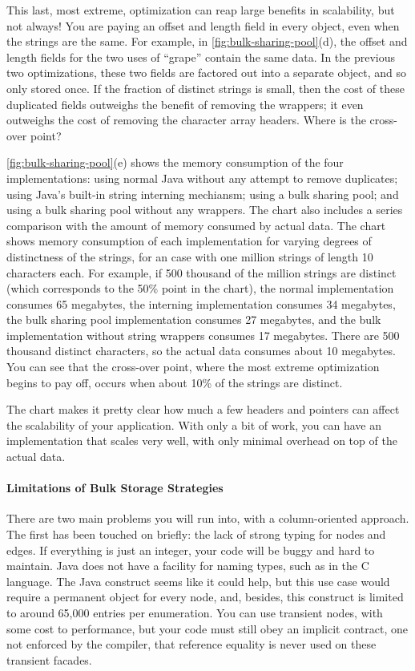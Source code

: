 This last, most extreme, optimization can reap large benefits in scalability,
but not always! You are paying an offset and length field in every object, even
when the strings are the same. For example, in
\autoref{fig:bulk-sharing-pool}(d), the offset and length fields for the two
uses of ``grape'' contain the same data. In the previous two optimizations,
these two fields are factored out into a separate  object, and so
only stored once. If the fraction of distinct strings
is small, then the cost of these duplicated fields outweighs the benefit of
removing the wrappers; it even outweighs the cost of removing the character
array headers. Where is the cross-over point?

\autoref{fig:bulk-sharing-pool}(e) shows the memory consumption of the four
implementations: using normal Java  without any attempt to remove
duplicates; using Java's built-in string interning mechiansm; using a bulk
sharing pool; and using a bulk sharing pool without any  wrappers.
The chart also includes a series comparison with the amount of memory consumed by
actual data.  The chart shows memory consumption of each implementation for
varying degrees of distinctness of the strings, for an case with one million
strings of length 10 characters each.
For example, if 500 thousand of the million strings are distinct (which
corresponds to the 50\% point in the chart), the normal implementation consumes
65 megabytes, the interning implementation consumes 34 megabytes, the bulk
sharing pool implementation consumes 27 megabytes, and the bulk implementation
without string wrappers consumes 17 megabytes. There are 500 thousand
distinct characters, so the actual data consumes about 10 megabytes. You can see
that the cross-over point, where the most extreme optimization begins to pay
off, occurs when about 10\% of the strings are distinct.

The chart makes it pretty clear how much a few headers and pointers can affect
the scalability of your application. With only a bit of work, you can have an
implementation that scales very well, with only minimal overhead on top of the
actual data.

\paragraph{Limitations of Bulk Storage Strategies}

There are two main problems you will run into, with a column-oriented approach.
The first has been touched on briefly: the lack of strong typing for nodes and
edges. If everything is just an integer, your code will be buggy and hard to
maintain. Java does not have a facility for naming types, such as 
in the C language. The Java  construct seems like it could help, but
this use case would require a permanent object for every node, and, besides,
this construct is limited to around 65,000 entries per enumeration. You can use transient
nodes, with some cost to performance, but your code must still obey an implicit
contract, one not enforced by the  compiler, that reference equality
is never used on these transient facades.

